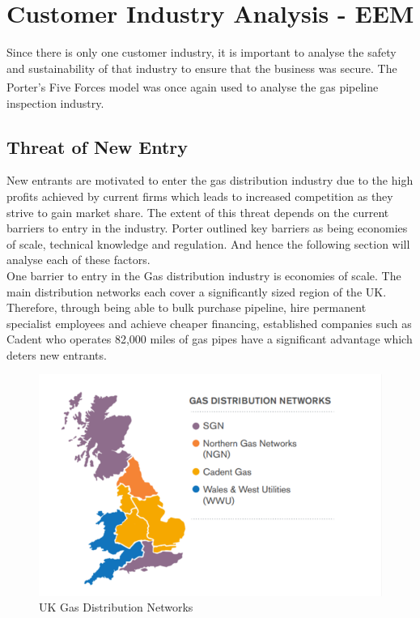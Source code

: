 \documentclass[11pt]{article}		%
\newcommand{\supercite}[1]{\textsuperscript{\cite{#1}}}		%
\begin{document}
	\section{Customer Industry Analysis - EEM}
		Since there is only one customer industry, it is important to analyse the safety and sustainability of that industry to ensure that the business was secure.
		The Porter's Five Forces model\supercite{porter2008five} was once again used to analyse the gas pipeline inspection industry.
			
		\subsection[Threat of New Entry]{Threat of New Entry}
				New entrants are motivated to enter the gas distribution industry due to the high profits achieved by current firms which leads to increased competition as they strive to gain market share. The extent of this threat depends on the current barriers to entry in the industry. Porter outlined key barriers as being economies of scale, technical knowledge and regulation. And hence the following section will analyse each of these factors. \\
				
				One barrier to entry in the Gas distribution industry is economies of scale. The main distribution networks each cover a significantly sized region of the UK. Therefore, through being able to bulk purchase pipeline, hire permanent specialist employees and achieve cheaper financing, established companies such as Cadent who operates 82,000 miles of gas pipes have a significant advantage which deters new entrants. \\
					\begin{figure}[h]
			    \centering
		    	\includegraphics[scale=0.8]{distribution.pdf}
			    \caption{UK Gas Distribution Networks} %
		    	\label{distrit}
	        	\end{figure}
				
\end{document}
